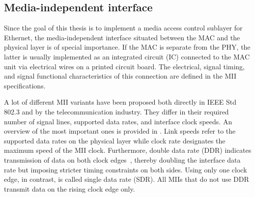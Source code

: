 \documentclass[a4paper, 11pt, oneside]{Thesis}  %
\begin{document}
\clearpage
\subsection{Media-independent interface}\label{ch:eth_mii}

Since the goal of this thesis is to implement a media access control sublayer for Ethernet, the media-independent interface situated between the MAC and the physical layer is of special importance. If the MAC is separate from the PHY, the latter is usually implemented as an integrated circuit (IC) connected to the MAC unit via electrical wires on a printed circuit board. The electrical, signal timing, and signal functional characteristics of this connection are defined in the MII specifications.

A lot of different MII variants have been proposed both directly in IEEE Std 802.3 and by the telecommunication industry. They differ in their required number of signal lines, supported data rates, and interface clock speeds. An overview of the most important ones is provided in . Link speeds refer to the supported data rates on the physical layer while clock rate designates the maximum speed of the MII clock. Furthermore, double data rate (DDR) indicates transmission of data on both clock edges~\cite{CompArchitecture}, thereby doubling the interface data rate but imposing stricter timing constraints on both sides. Using only one clock edge, in contrast, is called single data rate (SDR). All MIIs that do not use DDR transmit data on the rising clock edge only.
\end{document}
